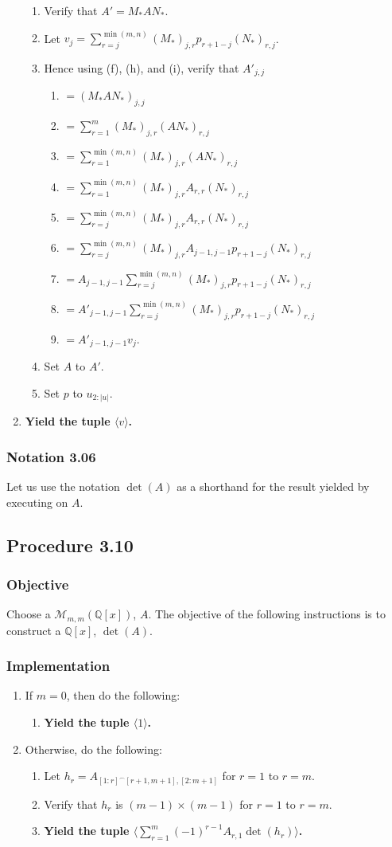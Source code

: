 \documentclass[twocolumn]{article}
\newcommand{\notation}[1]{\subsubsection*{Notation #1}}
\newcommand{\procedure}[2][]{\subsection*{Procedure #2 \ifthenelse{\equal{#1}{}}{}{(#1)}}\label{sec:procedure #2}}
\newcommand{\objective}{\subsubsection*{Objective}}
\newcommand{\implementation}{\subsubsection*{Implementation}}
\newcommand{\procedurehr}[2][]{\hyperref[sec:procedure #2]{\ifthenelse{\equal{#1}{}}{procedure #2}{#1}}}
\begin{document}
\begin{enumerate}
\begin{enumerate}
						\item Verify that $A'=M_*AN_*$.
						\item Let $v_j=\sum_{r=j}^{\min(m,n)} (M_*)_{j,r}p_{r+1-j}(N_*)_{r,j}$.
						\item Hence using (f), (h), and (i), verify that $A'_{j,j}$
						\begin{enumerate}
							\item $=(M_*AN_*)_{j,j}$
							\item $=\sum_{r=1}^m (M_*)_{j,r}(AN_*)_{r,j}$
							\item $=\sum_{r=1}^{\min(m,n)} (M_*)_{j,r}(AN_*)_{r,j}$
							\item $=\sum_{r=1}^{\min(m,n)} (M_*)_{j,r}A_{r,r}(N_*)_{r,j}$
							\item $=\sum_{r=j}^{\min(m,n)} (M_*)_{j,r}A_{r,r}(N_*)_{r,j}$
							\item $=\sum_{r=j}^{\min(m,n)} (M_*)_{j,r}A_{j-1,j-1}p_{r+1-j}(N_*)_{r,j}$
							\item $=A_{j-1,j-1}\sum_{r=j}^{\min(m,n)} (M_*)_{j,r}p_{r+1-j}(N_*)_{r,j}$
							\item $=A'_{j-1,j-1}\sum_{r=j}^{\min(m,n)} (M_*)_{j,r}p_{r+1-j}(N_*)_{r,j}$
							\item $=A'_{j-1,j-1}v_j$.
						\end{enumerate}
						\item Set $A$ to $A'$.
						\item Set $p$ to $u_{2:\lvert u\rvert}$.
					\end{enumerate}
					\item \textbf{Yield the tuple $\langle v\rangle$.}
				\end{enumerate}
		\notation{3.06}
			Let us use the notation $\det(A)$ as a shorthand for the result yielded by executing \procedurehr{3.10} on $A$.
		\procedure{3.10}
			\objective
				Choose a $\mathcal{M}_{m,m}(\mathbb{Q}[x])$, $A$. The objective of the following instructions is to construct a $\mathbb{Q}[x]$, $\det(A)$.
			\implementation
				\begin{enumerate}
					\item If $m=0$, then do the following:
					\begin{enumerate}
						\item \textbf{Yield the tuple $\langle 1\rangle$.}
					\end{enumerate}
					\item Otherwise, do the following:
					\begin{enumerate}
						\item Let $h_r=A_{[1:r]^\frown[r+1,m+1],[2:m+1]}$ for $r=1$ to $r=m$.
						\item Verify that $h_r$ is $(m-1)\times(m-1)$ for $r=1$ to $r=m$.
						\item \textbf{Yield the tuple $\langle\sum_{r=1}^m (-1)^{r-1}A_{r,1}\det(h_r)\rangle$.}
					\end{enumerate}
				\end{enumerate}
\end{document}
